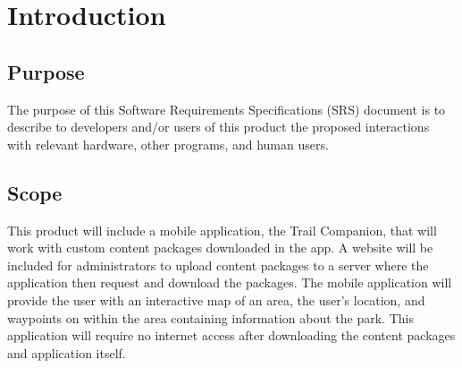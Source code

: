 \documentclass[letterpaper,10pt,titlepage]{article}
\begin{document}
\section{Introduction}
\subsection{Purpose}
The purpose of this Software Requirements Specifications (SRS) document is to describe to developers and/or users of this product the proposed interactions with relevant hardware, other programs, and human users. 

\subsection{Scope}
This product will include a mobile application, the Trail Companion, that will work with custom content packages downloaded in the app. A website will be included for administrators to upload content packages to a server where the application then request and download the packages. The mobile application will provide the user with an interactive map of an area, the user’s location, and waypoints on within the area containing information about the park. This application will require no internet access after downloading the content packages and application itself.
\end{document}

